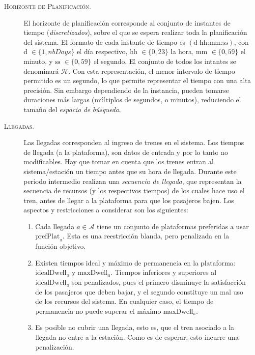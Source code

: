 \documentclass[letter, 10pt]{article}
\begin{document}
\begin{description}
	\item[\textsc{Horizonte de Planificación.}] 
	El horizonte de planificación corresponde al conjunto de instantes de tiempo (\textit{discretizados}),
	sobre el que se espera realizar toda la planificación del sistema. El formato de cada instante de tiempo
	es $(\text{d hh:mm:ss})$, con $\text{d } \in \{1, nbDays\}$ el día respectivo, $\text{hh } \in \{0,23\}$ 
	la hora, $\text{mm } \in \{0,59\}$ el minuto, y $\text{ss } \in \{0,59\}$ el segundo. El conjunto de todos
	los intantes se denominará $\mathcal{H}$. Con esta representación, el menor intervalo de tiempo permitido
	es un segundo, lo que permite representar el tiempo con una alta precisión. Sin embargo dependiendo de la 
	instancia, pueden tomarse duraciones más largas (múltiplos de segundos, o minutos), reduciendo el tamaño del
	\textit{espacio de búsqueda}.

	\item[\textsc{Llegadas.}]
	Las llegadas corresponden al ingreso de trenes en el sistema. Los tiempos de llegada (a la plataforma),
	son datos de entrada y por lo tanto no modificables. Hay que tomar en cuenta que los trenes entran al
	sistema/estación un tiempo antes que su hora de llegada. Durante este periodo intermedio realizan una
	\textit{secuencia de llegada}, que representan la secuencia de recursos (y los respectivos tiempos) de 
	los cuales hace uso el tren, antes de llegar a la plataforma para que los pasajeros bajen. Los aspectos
	y restricciones a considerar son los siguientes:
	\begin{enumerate}
		\item Cada llegada $a \in \mathcal{A}$ tiene un conjunto de plataformas preferidas a usar $\text{prefPlat}_a$.
		 Esta es una reestricción blanda, pero penalizada en la función objetivo.
		\item Existen tiempos ideal y máximo de permanencia en la plataforma: $\text{idealDwell}_a$ y $\text{maxDwell}_a$.
		Tiempos inferiores y superiores al $\text{idealDwell}_a$ son penalizados, pues el primero disminuye la satisfacción
		de los pasajeros que deben bajar, y el segundo constituye un mal uso de los recursos del sistema. En cualquier caso,
		el tiempo de permanencia no puede superar el máximo $\text{maxDwell}_a$.
		\item Es posible no cubrir una llegada, esto es, que el tren asociado a la llegada no entre a la estación. Como es de esperar, esto incurre una penalización.
	\end{enumerate}


\end{description}
\end{document}
